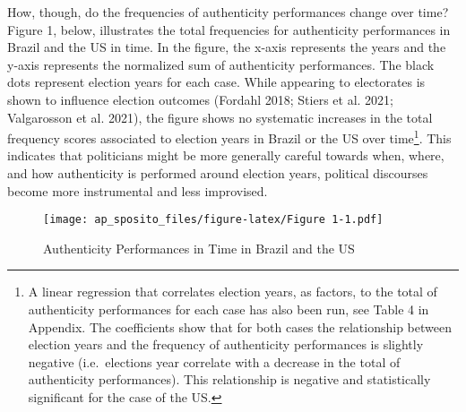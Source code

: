\documentclass[
  12pt,
]{article}
\begin{document}
How, though, do the frequencies of authenticity performances change over
time? Figure 1, below, illustrates the total frequencies for
authenticity performances in Brazil and the US in time. In the figure,
the x-axis represents the years and the y-axis represents the normalized
sum of authenticity performances. The black dots represent election
years for each case. While appearing to electorates is shown to
influence election outcomes (Fordahl 2018; Stiers et al. 2021;
Valgarosson et al. 2021), the figure shows no systematic increases in
the total frequency scores associated to election years in Brazil or the
US over time\footnote{ A linear regression that correlates election
  years, as factors, to the total of authenticity performances for each
  case has also been run, see Table 4 in Appendix. The coefficients show
  that for both cases the relationship between election years and the
  frequency of authenticity performances is slightly negative
  (i.e.~elections year correlate with a decrease in the total of
  authenticity performances). This relationship is negative and
  statistically significant for the case of the US.}. This indicates
that politicians might be more generally careful towards when, where,
and how authenticity is performed around election years, political
discourses become more instrumental and less improvised.

\begin{figure}
\centering
\texttt{[image: ap\_sposito\_files/figure-latex/Figure 1-1.pdf]}
\caption{Authenticity Performances in Time in Brazil and the US}
\end{figure}
\end{document}
